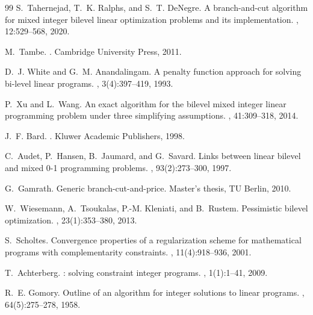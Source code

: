 \documentclass[11pt]{article}
\begin{document}
\begin{thebibliography}{99}
S.~Tahernejad, T.~K. Ralphs, and S.~T. DeNegre.
\newblock A branch-and-cut algorithm for mixed integer bilevel linear
  optimization problems and its implementation.
, 12:529--568, 2020.

M.~Tambe.
.
\newblock Cambridge University Press, 2011.

D.~J. White and G.~M. Anandalingam.
\newblock A penalty function approach for solving bi-level linear programs.
, 3(4):397--419, 1993.

P.~Xu and L.~Wang.
\newblock An exact algorithm for the bilevel mixed integer linear programming
  problem under three simplifying assumptions.
, 41:309--318, 2014.

J.~F. Bard.
.
\newblock Kluwer Academic Publishers, 1998.

C.~Audet, P.~Hansen, B.~Jaumard, and G.~Savard.
\newblock Links between linear bilevel and mixed 0-1 programming problems.
,
  93(2):273--300, 1997.

G.~Gamrath.
\newblock Generic branch-cut-and-price.
\newblock Master's thesis, TU Berlin, 2010.

W.~Wiesemann, A.~Tsoukalas, P.-M. Kleniati, and B.~Rustem.
\newblock Pessimistic bilevel optimization.
, 23(1):353--380, 2013.

S.~Scholtes.
\newblock Convergence properties of a regularization scheme for mathematical
  programs with complementarity constraints.
, 11(4):918--936, 2001.

T.~Achterberg.
: solving constraint integer programs.
, 1(1):1--41, 2009.

R.~E. Gomory.
\newblock Outline of an algorithm for integer solutions to linear programs.
, 64(5):275--278, 1958.


\end{thebibliography}
\end{document}

